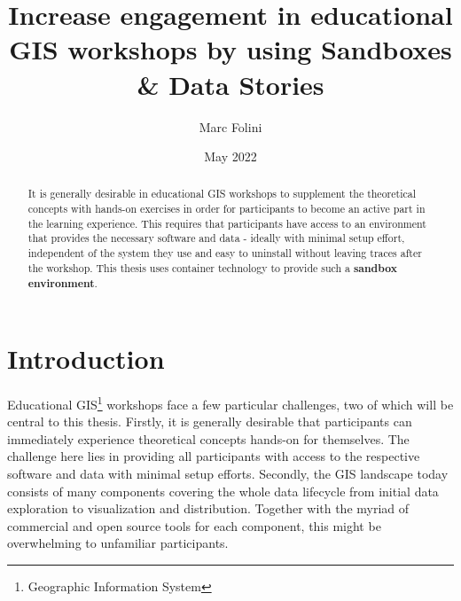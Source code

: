 \documentclass[12pt, a4paper, oneside, parskip=full*]{scrartcl}
\title{Increase engagement in educational GIS workshops by using Sandboxes \& Data Stories}
\author{Marc Folini}
\date{May 2022}
\begin{document}
\begin{titlepage}
  \setcounter{page}{1}
  \clearpage\maketitle
  \thispagestyle{empty}
  \vspace{5.5cm}
  \begin{abstract}
    It is generally desirable in educational GIS workshops to supplement the theoretical concepts with hands-on
    exercises in order for participants to become an active part in the learning experience. This requires that
    participants have access to an environment that provides the necessary software and data - ideally with minimal
    setup effort, independent of the system they use and easy to uninstall without leaving traces after the workshop.
    This thesis uses container technology to provide such a \textbf{sandbox environment}.
  \end{abstract}
\end{titlepage}

\newpage
\tableofcontents

\newpage
{}
\setcounter{page}{1}
\section{Introduction}
Educational GIS\footnote{Geographic Information System} workshops face a few particular challenges, two of which will be
central to this thesis. Firstly, it is generally desirable that participants can immediately experience theoretical
concepts hands-on for themselves. The challenge here lies in providing all participants with access to the respective
software and data with minimal setup efforts. Secondly, the GIS landscape today consists of many components covering the
whole data lifecycle from initial data exploration to visualization and distribution. Together with the myriad of
commercial and open source tools for each component, this might be overwhelming to unfamiliar participants.
\end{document}
